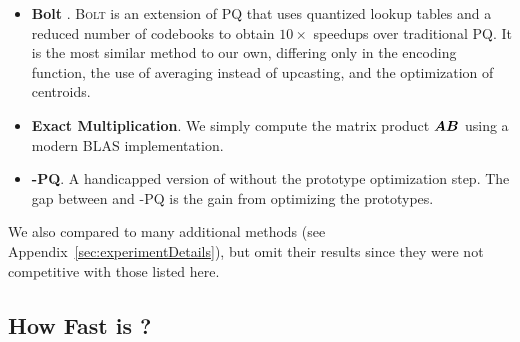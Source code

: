 \begin{itemize}
    \item \textbf{Bolt} \cite{bolt}. \textsc{Bolt} is an extension of PQ that uses quantized lookup tables and a reduced number of codebooks to obtain $10\times$ speedups over traditional PQ. It is the most similar method to our own, differing only in the encoding function, the use of averaging instead of upcasting, and the optimization of centroids. %
    \item \textbf{Exact Multiplication}. We simply compute the matrix product $\bm{A}\bm{B}$ using a modern BLAS implementation.
    \item \textbf{\ours-PQ}. A handicapped version of \oursp without the prototype optimization step. The gap between \oursp and \ours-PQ is the gain from optimizing the prototypes.
\end{itemize}
\vspace{-2mm}
We also compared to many additional methods (see Appendix~\ref{sec:experimentDetails}), but omit their results since they were not competitive with those listed here.

\vspace{-1mm}
\subsection{How Fast is \ours?}
\vspace{-.5mm}

